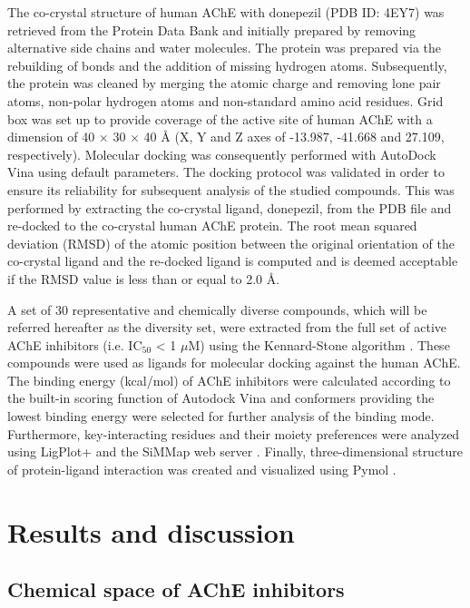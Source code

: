 \documentclass[fleqn,10pt]{wlpeerj}
\begin{document}
The co-crystal structure of human AChE with donepezil (PDB ID: 4EY7) was retrieved from the Protein Data Bank and initially prepared by removing alternative side chains and water molecules. The protein was prepared via the rebuilding of bonds and the addition of missing hydrogen atoms. Subsequently, the protein was cleaned by merging the atomic charge and removing lone pair atoms, non-polar hydrogen atoms and non-standard amino acid residues. Grid box was set up to provide coverage of the active site of human AChE with a dimension of 40 $\times$ 30 $\times$ 40 {\AA} (X, Y and Z axes of -13.987, -41.668 and 27.109, respectively). Molecular docking was consequently performed with AutoDock Vina \citep{trott2010autodockvina} using default parameters. The docking protocol was validated in order to ensure its reliability for subsequent analysis of the studied compounds. This was performed by extracting the co-crystal ligand, donepezil, from the PDB file and re-docked to the co-crystal human AChE protein. The root mean squared deviation (RMSD) of the atomic position between the original orientation of the co-crystal ligand and the re-docked ligand is computed and is deemed acceptable if the RMSD value is less than or equal to 2.0 {\AA}.

A set of 30 representative and chemically diverse compounds, which will be referred hereafter as the diversity set, were extracted from the full set of active AChE inhibitors (i.e. IC$_{50}$ < 1 $\mu$M) using the Kennard-Stone algorithm \citep{kennardstone1969}. These compounds were used as ligands for molecular docking against the human AChE. The binding energy (kcal/mol) of AChE inhibitors were calculated according to the built-in scoring function of Autodock Vina and conformers providing the lowest binding energy were selected for further analysis of the binding mode. Furthermore, key-interacting residues and their moiety preferences were analyzed using LigPlot+ \citep{Wallace01021995} and the SiMMap web server \citep{bollback2006simmap}. Finally, three-dimensional structure of protein-ligand interaction was created and visualized using Pymol \citep{pymol2015}.

\section*{Results and discussion}

\subsection*{Chemical space of AChE inhibitors}
\end{document}
